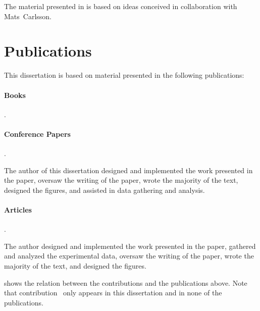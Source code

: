 The material presented in  is based on ideas
conceived in collaboration with Mats~Carlsson.


\section{Publications}

This dissertation is based on material presented in the following publications:


\paragraph{Books}

\begin{publications}
  \item {}
    .
\end{publications}


\paragraph{Conference Papers}

\begin{publications}[resume]
  \item {}
    .
    \begin{authorsContribution}
      The author of this dissertation designed and implemented the work
      presented in the paper, oversaw the writing of the paper, wrote the
      majority of the text, designed the figures, and assisted in data gathering
      and analysis.
    \end{authorsContribution}
\end{publications}


\paragraph{Articles}

\begin{publications}[resume]
  \item {}
    .
    \begin{authorsContribution}
      The author designed and implemented the work presented in the paper,
      gathered and analyzed the experimental data, oversaw the writing of the
      paper, wrote the majority of the text, and designed the figures.
    \end{authorsContribution}
\end{publications}
%
 shows the relation between the
contributions and the publications above.
%
Note that contribution~ only appears in this
dissertation and in none of the publications.

